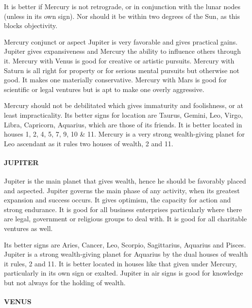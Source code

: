  

It is better if Mercury is not retrograde, or in conjunction with the lunar nodes (unless in its own sign). Nor should it be within two degrees of the Sun, as this blocks objectivity.

 

Mercury conjunct or aspect Jupiter is very favorable and gives practical gains. Jupiter gives expansiveness and Mercury the ability to influence others through it. Mercury with Venus is good for creative or artistic pursuits. Mercury with Saturn is all right for property or for serious mental pursuits but otherwise not good. It makes one materially conservative. Mercury with Mars is good for scientific or legal ventures but is apt to make one overly aggressive.

 

Mercury should not be debilitated which gives immaturity and foolishness, or at least impracticality. Its better signs for location are Taurus, Gemini, Leo, Virgo, Libra, Capricorn, Aquarius, which are those of its friends. It is better located in houses 1, 2, 4, 5, 7, 9, 10 & 11. Mercury is a very strong wealth-giving planet for Leo ascendant as  it rules two houses of wealth, 2 and 11.

 

\paragraph{JUPITER}

Jupiter is the main planet that gives wealth, hence he should be favorably placed and aspected. Jupiter governs the main phase of any activity, when its greatest expansion and success occurs. It gives optimism, the capacity for action and strong endurance. It is good for all business enterprises particularly where there are legal, government or religious groups to deal with. It is good for all charitable ventures as well.

 

Its better signs are Aries, Cancer, Leo, Scorpio, Sagittarius, Aquarius and Pisces. Jupiter is a strong wealth-giving planet for Aquarius by the dual houses of wealth it rules, 2 and 11. It is better located in houses like that given under Mercury, particularly in its own sign or exalted. Jupiter in air signs is good for knowledge but not always for the holding of wealth.

 

\paragraph{VENUS}

